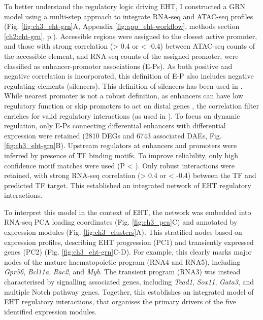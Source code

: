 To better understand the regulatory logic driving EHT, I constructed a GRN model using a multi-step approach to integrate RNA-seq and ATAC-seq profiles (Fig. \ref{fig:ch3_eht-grn}A, Appendix \ref{fig:app_eht-workflow}, methods section \ref{ch2:eht-grn}, p.\pageref{ch2:eht-grn}). Accessible regions were assigned to the closest active promoter, and those with strong correlation (> 0.4 or < -0.4) between ATAC-seq counts of the accessible element, and RNA-seq counts of the assigned promoter, were classified as enhancer-promoter associations (E-Ps). As both positive and negative correlation is incorporated, this definition of E-P also includes negative regulating elements (silencers). This definition of silencers has been used in \cite{cornejo-paramo_distal_2022}. While nearest promoter is not a robust definition, as enhancers can have low regulatory function or skip promoters to act on distal genes \citep{chepelev_characterization_2012}, the correlation filter enriches for valid regulatory interactions (as used in \cite{sheffield_patterns_2013, hariprakash_computational_2019}). To focus on dynamic regulation, only E-Ps connecting differential enhancers with differential expression were retained (2810 DEGs and 6743 associated DAEs, Fig. \ref{fig:ch3_eht-grn}B). Upstream regulators at enhancers and promoters were inferred by presence of TF binding motifs. To improve reliability, only high confidence motif matches were used (P < ). Only robust interactions were retained, with strong RNA-seq correlation (> 0.4 or < -0.4) between the TF and predicted TF target. This established an integrated network of EHT regulatory interactions.

To interpret this model in the context of EHT, the network was embedded into RNA-seq PCA loading coordinates (Fig. \ref{fig:ch3_pca}C) and annotated by expression modules (Fig. \ref{fig:ch3_clusters}A). This stratified nodes based on expression profiles, describing EHT progression (PC1) and transiently expressed genes (PC2) (Fig. \ref{fig:ch3_eht-grn}C-D). For example, this clearly marks major nodes of the mature haematopoietic program (RNA4 and RNA5), including \textit{Gpr56}, \textit{Bcl11a}, \textit{Rac2}, and \textit{Myb}. The transient program (RNA3) was instead characterised by signalling associated genes, including \textit{Tead1}, \textit{Sox11}, \textit{Gata3}, and multiple Notch pathway genes. Together, this establishes an integrated model of EHT regulatory interactions, that organises the primary drivers of the five identified expression modules. 

